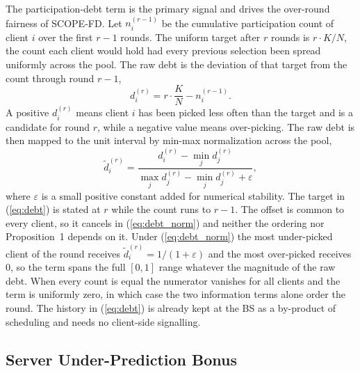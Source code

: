 \documentclass[journal]{IEEEtran}
\newcommand{\rev}[1]{{\color{blue}#1}}
\begin{document}
The participation-debt term is the primary signal and drives the over-round fairness of SCOPE-FD. Let $n_i^{(r-1)}$ be the cumulative participation count of client $i$ over the first $r-1$ rounds. The uniform target after $r$ rounds is $r\cdot K/N$, the count each client would hold had every previous selection been spread uniformly across the pool. The raw debt is the deviation of that target from the count through round $r-1$,
\begin{equation}
d_i^{(r)} = r\cdot \frac{K}{N} - n_i^{(r-1)}.
\label{eq:debt}
\end{equation}
A positive $d_i^{(r)}$ means client $i$ has been picked less often than the target and is a candidate for round $r$, while a negative value means over-picking. The raw debt is then mapped to the unit interval by min-max normalization across the pool,
\begin{equation}
\tilde{d}_i^{(r)} = \frac{d_i^{(r)} - \min_j d_j^{(r)}}{\max_j d_j^{(r)} - \min_j d_j^{(r)} + \varepsilon},
\label{eq:debt_norm}
\end{equation}
where $\varepsilon$ is a small positive constant added for numerical stability. \rev{The target in (\ref{eq:debt}) is stated at $r$ while the count runs to $r-1$. The offset is common to every client, so it cancels in (\ref{eq:debt_norm}) and neither the ordering nor Proposition~1 depends on it.} Under (\ref{eq:debt_norm}) the most under-picked client of the round receives $\tilde{d}_i^{(r)} = 1/(1+\varepsilon)$ and the most over-picked receives $0$, so the term spans the full $[0,1]$ range whatever the magnitude of the raw debt. \rev{When every count is equal the numerator vanishes for all clients and the term is uniformly zero, in which case the two information terms alone order the round.} The history in (\ref{eq:debt}) is already kept at the BS as a by-product of scheduling and needs no client-side signalling.

\subsection{Server Under-Prediction Bonus}
\label{ssec:bonus-term}
\end{document}
